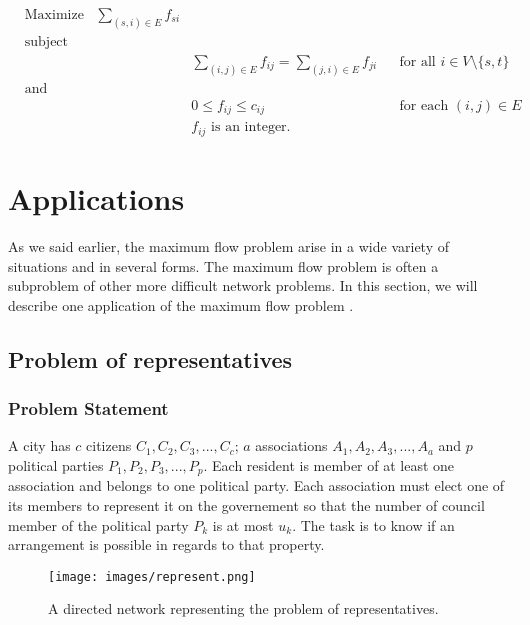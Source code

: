 \begin{equation}
\begin{aligned}
& {\text{Maximize}} & \sum\limits_{(s,i) \in E} f_{si} & & &\\
& \text{subject to} & & & &\\
& & & \sum\limits_{(i,j)\in E} f_{ij} = \sum\limits_{(j,i)\in E} f_{ji} & & \text{for all } i \in V \setminus \{s, t\}\\
& \text{and} & & & & \\
& & & 0 \leq f_{ij} \leq c_{ij} & & \text{for each } (i, j) \in E\\
& & & f_{ij} \text{ is an integer.}& &
\end{aligned}
\end{equation}

\section{Applications}
\label{sec:applications}
As we said earlier, the maximum flow problem arise in a wide variety of situations and in several forms. The maximum flow problem is often a subproblem of other more difficult network problems. In this section, we will describe one application of the maximum flow problem \cite{networkflows}.

\subsection{Problem of representatives}

\subsubsection{Problem Statement}

A city has $c$ citizens $C_1, C_2, C_3, ..., C_c$; $a$ associations $A_1, A_2, A_3, ..., A_a$ and $p$ political parties $P_1, P_2, P_3, ..., P_p$. Each resident is member of at least one association and belongs to one political party. Each association  must elect one of its members to represent it on the governement so that the number of council member of the political party $P_k$ is at most $u_k$. The task is to know if an arrangement is possible in regards to that property.

\begin{figure}[h]
\centering
\texttt{[image: images/represent.png]}
\caption{A directed network representing the problem of representatives.}
\label{img:represent}
\end{figure}

